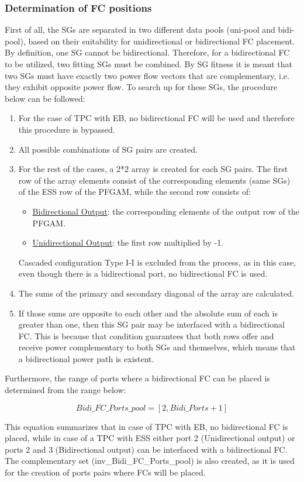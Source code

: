 \documentclass[conference]{IEEEtran}
\begin{document}
\subsubsection{Determination of FC positions}
First of all, the SGs are separated in two different data pools (uni-pool and bidi-pool), based on their suitability for unidirectional or bidirectional FC placement. By definition, one SG cannot be bidirectional. Therefore, for a bidirectional FC to be utilized, two fitting SGs must be combined. By SG fitness it is meant that two SGs must have exactly two power flow vectors that are complementary, i.e. they exhibit opposite power flow. To search up for these SGs, the procedure below can be followed:
\begin{enumerate}[label=\alph*)]
    \item For the case of TPC with EB, no bidirectional FC will be used and therefore this procedure is bypassed.
    \item All possible combinations of SG pairs are created.
    \item For the rest of the cases, a 2*2 array is created for each SG pairs. The first row of the array elements consist of the corresponding elements (same SGs) of the ESS row of the PFGAM, while the second row consists of:
    \begin{itemize}
        \item \underline{Bidirectional Output}: the corresponding elements of the output row of the PFGAM.
        \item \underline{Unidirectional Output}: the first row multiplied by -1.
    \end{itemize}
    Cascaded configuration Type I-I is excluded from the process, as in this case, even though there is a bidirectional port, no bidirectional FC is used. 
    \item The sums of the primary and secondary diagonal of the array are calculated.
    \item If those sums are opposite to each other and the absolute sum of each is greater than one, then this SG pair may be interfaced with a bidirectional FC. This is because that condition guarantees that both rows offer and receive power complementary to both SGs and themselves, which means that a bidirectional power path is existent.
\end{enumerate}

Furthermore, the range of ports where a bidirectional FC can be placed is determined from the range below:
\begin{small}
    \begin{equation}
    Bidi\_FC\_Ports\_pool = [2, Bidi\_Ports+1]
    \label{eq:pool}\end{equation}
\end{small}
This equation summarizes that in case of TPC with EB, no bidirectional FC is placed, while in case of a TPC with ESS either port 2 (Unidirectional output) or ports 2 and 3 (Bidirectional output) can be interfaced with a bidirectional FC. The complementary set (inv\_Bidi\_FC\_Ports\_pool) is also created, as it is used for the creation of ports pairs where FCs will be placed.
\end{document}
